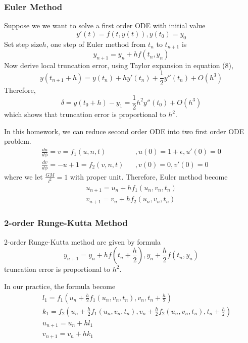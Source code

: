 \documentclass[12pt]{article}
\begin{document}
\subsubsection{Euler Method}
Suppose we we want to solve a first order ODE with initial value
\begin{equation}
	y'(t)=f(t,y(t)),  y(t_0)=y_0 \nonumber
\end{equation}
Set step size$h$, one step of Euler method from $t_n$ to $t_{n+1}$ is
\begin{equation}
	y_{n+1}=y_n+hf(t_n,y_n)
\end{equation}
Now derive local truncation error, using Taylor expansion in equation (8),
\begin{equation}
	y(t_{n+1}+h)=y(t_n)+hy'(t_n)+\frac{1}{2}y''(t_n)+O(h^3)
\end{equation}
Therefore, 
\begin{equation}
	\delta=y(t_0+h)-y_1=\frac{1}{2}h^2y''(t_0)+O(h^3)
\end{equation}
which shows that truncation error is proportional to $h^2$.

In this homework, we can reduce second order ODE into two first order ODE problem.
\begin{eqnarray}
	\frac{du}{d\phi}=v=f_1(u,n,t)&&,u(0)=1+\epsilon,u'(0)=0\nonumber\\
	\frac{dv}{d\phi}=-u+1=f_2(v,n,t)&&,v(0)=0,v'(0)=0
\end{eqnarray}
where we let $\frac{GM}{l^2}=1$ with proper unit. Therefore, Euler method become
\begin{eqnarray}
	u_{n+1}=u_n+h f_1(u_n,v_n,t_n)\nonumber\\
	v_{n+1}=v_n+h f_2(u_n,v_n,t_n)
\end{eqnarray}



\subsubsection{2-order Runge-Kutta Method}
2-order Runge-Kutta method are given by formula
\begin{equation}
	y_{n+1}=y_n+hf(t_n+\frac{h}{2}),y_n+\frac{h}{2}f(t_n,y_n)
\end{equation}
truncation error is proportional to $h^2$.

In our practice, the formula become
\begin{eqnarray}
	&&l_1=f_1(u_n+\frac{h}{2}f_1(u_n,v_n,t_n),v_n,t_n+\frac{h}{2})\nonumber\\
	&&k_1=f_2(u_n+\frac{h}{2}f_1(u_n,v_n,t_n),v_n+\frac{h}{2}f_2(u_n,v_n,t_n),t_n+\frac{h}{2})\nonumber\\
	&&u_{n+1}=u_n+h l_1\nonumber\\
	&&v_{n+1}=v_n+h k_1
\end{eqnarray}
\end{document}

